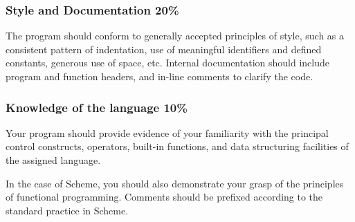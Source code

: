 \documentclass[12pt,info]{asg}
\begin{document}
\subsubsection*{Style and Documentation 20\%} The program should conform to generally accepted principles of style, such as a consistent pattern of indentation, use of meaningful identifiers and defined constants, generous use of space, etc. Internal documentation should include program and function headers, and in-line comments to clarify the code.
\subsubsection*{Knowledge of the language 10\%} Your program should provide evidence of your familiarity with the principal control constructs, operators, built-in functions, and data structuring facilities of the assigned language. 

In the case of Scheme, you should also demonstrate your grasp of the principles of functional programming. Comments should be prefixed according to the standard practice in Scheme.


\end{document}
